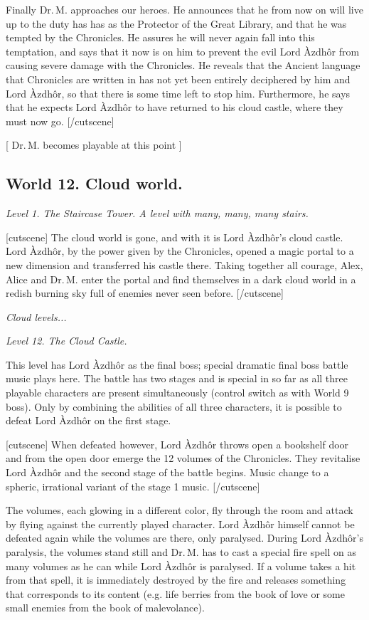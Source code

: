 \documentclass{gd-document}
\newcommand\DrM{Dr.\,M.\xspace}
\newcommand\Azdhor{Lord Àzdhôr\xspace}
\newcommand\level[1]{\textit{#1}}
\begin{document}
Finally \DrM approaches our heroes. He announces that he from now on
will live up to the duty has has as the Protector of the Great
Library, and that he was tempted by the Chronicles. He assures he will
never again fall into this temptation, and says that it now is on him
to prevent the evil \Azdhor from causing severe damage with the
Chronicles. He reveals that the Ancient language that Chronicles are
written in has not yet been entirely deciphered by him and \Azdhor, so that
there is some time left to stop him. Furthermore, he says that he
expects \Azdhor to have returned to his cloud castle, where they must
now go.
[/cutscene]

[ \DrM becomes playable at this point ]

\subsection{World 12. Cloud world.}

\level{Level 1. The Staircase Tower. A level with many, many, many
  stairs.}

[cutscene]
The cloud world is gone, and with it is \Azdhor{}’s cloud
castle. \Azdhor, by the power given by the Chronicles, opened a magic
portal to a new dimension and transferred his castle there. Taking
together all courage, Alex, Alice and \DrM enter the portal and find
themselves in a dark cloud world in a redish burning sky full of enemies never seen before.
[/cutscene]

\level{Cloud levels...}

\level{Level 12. The Cloud Castle.}

This level has \Azdhor as the final boss; special dramatic final boss
battle music plays here. The battle has two stages and is special in
so far as all three playable characters are present simultaneously
(control switch as with World 9 boss). Only by combining the abilities
of all three characters, it is possible to defeat \Azdhor on the first
stage.

[cutscene]
When defeated however, \Azdhor throws open a bookshelf door and from
the open door emerge the 12 volumes of the Chronicles. They revitalise
\Azdhor and the second stage of the battle begins. Music change to a
spheric, irrational variant of the stage 1 music.
[/cutscene]

The volumes, each glowing in a different color, fly through the room
and attack by flying against the currently played character. \Azdhor
himself cannot be defeated again while the volumes are there, only
paralysed. During \Azdhor{}’s paralysis, the volumes stand still and \DrM
has to cast a special fire spell on as many volumes as he can while
\Azdhor is paralysed. If a volume takes a hit from that spell, it is
immediately destroyed by the fire and releases something that
corresponds to its content (e.g. life berries from the book of love or
some small enemies from the book of malevolance).
\end{document}
